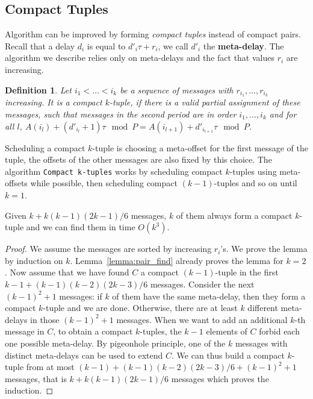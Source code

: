 \documentclass[pdflatex,sn-mathphys,iicol]{sn-jnl}%
\theoremstyle{thmstyleone}%
\theoremstyle{thmstyletwo}%
\theoremstyle{thmstylethree}%
\newtheorem{definition}{Definition}%
\begin{document}
\subsection{Compact Tuples}\label{sec:compact}

Algorithm \compactpair can be improved by forming \emph{compact tuples} instead of compact pairs. Recall that a delay $d_i$ is equal to  $d'_i\tau + r_i$, we call $d'_i$ the \textbf{meta-delay}. The algorithm we describe relies only on meta-delays and the fact that values $r_i$ are increasing.

\begin{definition}
Let $i_1 < \dots < i_k$ be a sequence of messages with $r_{i_1},\dots,r_{i_k}$ increasing. 
It is a compact $k$-tuple, if there is a valid partial assignment of these messages, such that messages in the second period are in order $i_1,\dots,i_k$ and for all $l$, $A(i_l) + (d'_{i_l} + 1)\tau \mod P = A(i_{l+1}) + d'_{i_{l+1}}\tau \mod P$.
\end{definition}

 Scheduling a compact $k$-tuple is choosing a meta-offset for the first message of the tuple, the offsets of the other messages are also fixed by this choice. The algorithm \texttt{Compact k-tuples} works by scheduling compact $k$-tuples using meta-offsets while possible, then scheduling compact $(k-1)$-tuples and so on until $k=1$.
 


\begin{lemma}\label{lemma:uple_find}
Given $k + k(k-1)(2k-1)/6$ messages, $k$ of them always form a compact $k$-tuple and we can find them in time $O(k^3)$. 
\end{lemma}
\begin{proof}
We assume the messages are sorted by increasing $r_i$'s. We prove the lemma by induction on $k$. Lemma~\ref{lemma:pair_find} already proves the lemma for $k=2$.
Now assume that we have found $C$ a compact $(k-1)$-tuple in the first $k-1 + (k-1)(k-2)(2k-3)/6$ messages. Consider the next $(k-1)^2 + 1$ messages: if $k$ of them have the same meta-delay, then they form a compact $k$-tuple and we are done. Otherwise, there are at least $k$ different meta-delays in those $(k-1)^2 + 1$ messages. When we want to add an additional $k$-th message in $C$, to obtain a compact $k$-tuples, the $k-1$ elements of $C$ forbid each one possible meta-delay. By pigeonhole principle, one of the $k$ messages with distinct meta-delays can be used to extend $C$. We can thus build a compact $k$-tuple from at most $(k-1) + (k-1)(k-2)(2k-3)/6 + (k-1)^2 + 1$ messages, that is $k + k(k-1)(2k-1)/6$ messages which proves the induction.
\end{proof}
\end{document}
